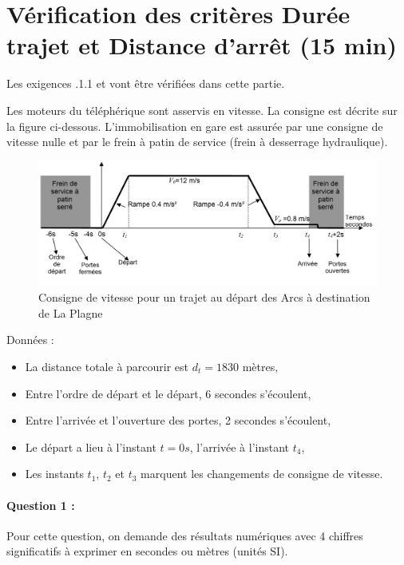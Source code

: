 \section{Vérification des critères \og Durée trajet \fg  et \og Distance d'arrêt \fg (15 min)}

Les exigences .1.1 \fg et  \fg vont être vérifiées dans cette partie.

Les moteurs du téléphérique sont asservis en vitesse. La consigne est décrite sur la figure ci-dessous. L'immobilisation en gare est assurée par une consigne de vitesse nulle et par le frein à patin de service (frein à desserrage hydraulique).

\begin{figure}[!h]
\centering
\includegraphics[width=0.8\linewidth]{img/fig17}
\caption{Consigne de vitesse pour un trajet au départ des Arcs à destination de La Plagne}
\label{fig17}
\end{figure}

Données :
\begin{itemize}
 \item La distance totale à parcourir est $d_t=1830$ mètres,
 \item Entre l'ordre de départ et le départ, 6 secondes s'écoulent,
 \item Entre l'arrivée et l'ouverture des portes, 2 secondes s'écoulent,
 \item Le départ a lieu à l'instant $t=0s$, l'arrivée à l'instant $t_4$,
 \item Les instants $t_1$, $t_2$ et $t_3$ marquent les changements de consigne de vitesse.
\end{itemize}

\paragraph{Question 1 :} Pour cette question, on demande des résultats numériques avec 4 chiffres significatifs à exprimer en secondes ou mètres (unités SI).

